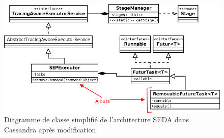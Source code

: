 \documentclass[12pt]{article}
\begin{document}
\begin{figure}[p]
	\centering
		\includegraphics[width=15cm]{images/implementation/stages_diagram_modified.png}
	\caption{Diagramme de classe simplifié de l'architecture SEDA dans Cassandra après modification \label{fig:stages_diagram_modified}}
\end{figure}
\end{document}
